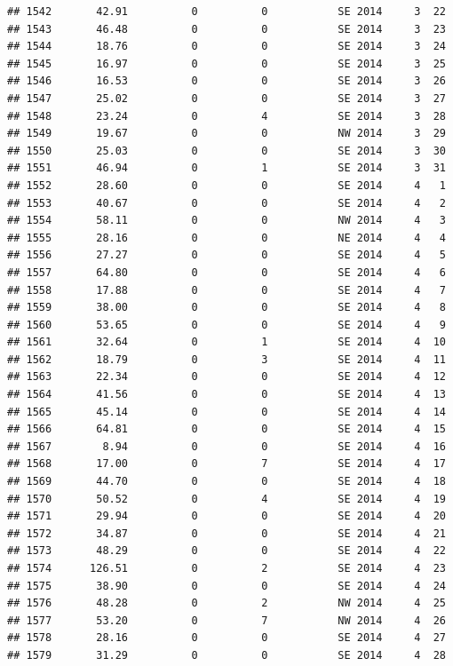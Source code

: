 \documentclass[
]{article}
\begin{document}
\begin{verbatim}
## 1542       42.91          0          0           SE 2014     3  22
## 1543       46.48          0          0           SE 2014     3  23
## 1544       18.76          0          0           SE 2014     3  24
## 1545       16.97          0          0           SE 2014     3  25
## 1546       16.53          0          0           SE 2014     3  26
## 1547       25.02          0          0           SE 2014     3  27
## 1548       23.24          0          4           SE 2014     3  28
## 1549       19.67          0          0           NW 2014     3  29
## 1550       25.03          0          0           SE 2014     3  30
## 1551       46.94          0          1           SE 2014     3  31
## 1552       28.60          0          0           SE 2014     4   1
## 1553       40.67          0          0           SE 2014     4   2
## 1554       58.11          0          0           NW 2014     4   3
## 1555       28.16          0          0           NE 2014     4   4
## 1556       27.27          0          0           SE 2014     4   5
## 1557       64.80          0          0           SE 2014     4   6
## 1558       17.88          0          0           SE 2014     4   7
## 1559       38.00          0          0           SE 2014     4   8
## 1560       53.65          0          0           SE 2014     4   9
## 1561       32.64          0          1           SE 2014     4  10
## 1562       18.79          0          3           SE 2014     4  11
## 1563       22.34          0          0           SE 2014     4  12
## 1564       41.56          0          0           SE 2014     4  13
## 1565       45.14          0          0           SE 2014     4  14
## 1566       64.81          0          0           SE 2014     4  15
## 1567        8.94          0          0           SE 2014     4  16
## 1568       17.00          0          7           SE 2014     4  17
## 1569       44.70          0          0           SE 2014     4  18
## 1570       50.52          0          4           SE 2014     4  19
## 1571       29.94          0          0           SE 2014     4  20
## 1572       34.87          0          0           SE 2014     4  21
## 1573       48.29          0          0           SE 2014     4  22
## 1574      126.51          0          2           SE 2014     4  23
## 1575       38.90          0          0           SE 2014     4  24
## 1576       48.28          0          2           NW 2014     4  25
## 1577       53.20          0          7           NW 2014     4  26
## 1578       28.16          0          0           SE 2014     4  27
## 1579       31.29          0          0           SE 2014     4  28

\end{verbatim}
\end{document}
